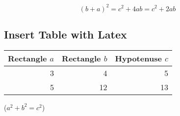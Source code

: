 \documentclass[11pt]{article}
\begin{document}
\begin{equation}
(b + a) ^2 = c^2 + 4ab = c^2 + 2ab
\end{equation}

\subsection{Insert Table with Latex}

\begin{table}[H]
\begin{tabular}{|rrr|}
\hline
Rectangle $a$ & Rectangle $b$ & Hypotenuse $c$ \\
\hline
    3         & 4             & 5              \\
    5         & 12            & 13             \\
\hline
\end{tabular}
\qquad
($a^2 + b^2 = c^2$)
\end{table}


\end{document}
